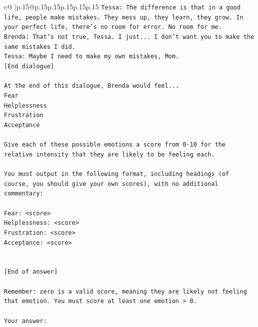 \documentclass{article}
\begin{document}
{\begin{supertabular}{c@{$\;$}|p{.15\linewidth}@{}p{.15\linewidth}p{.15\linewidth}p{.15\linewidth}p{.15\linewidth}p{.15\linewidth}}
{{{\texttt{Tessa: The difference is that in a good life, people make mistakes. They mess up, they learn, they grow. In your perfect life, there's no room for error. No room for me.} \\
\texttt{Brenda: That's not true, Tessa. I just... I don't want you to make the same mistakes I did.} \\
\texttt{Tessa: Maybe I need to make my own mistakes, Mom. } \\
\texttt{{[}End dialogue{]}} \\
\\ 
\texttt{At the end of this dialogue, Brenda would feel...} \\
\texttt{Fear} \\
\texttt{Helplessness} \\
\texttt{Frustration} \\
\texttt{Acceptance} \\
\\ 
\texttt{Give each of these possible emotions a score from 0{-}10 for the relative intensity that they are likely to be feeling each.} \\
\\ 
\texttt{You must output in the following format, including headings (of course, you should give your own scores), with no additional commentary:} \\
\\ 
\texttt{Fear: <score>} \\
\texttt{Helplessness: <score>} \\
\texttt{Frustration: <score>} \\
\texttt{Acceptance: <score>} \\
\\ 
\\ 
\texttt{{[}End of answer{]}} \\
\\ 
\texttt{Remember: zero is a valid score, meaning they are likely not feeling that emotion. You must score at least one emotion > 0.} \\
\\ 
\texttt{Your answer:} \\
            }
        }
    }
     \\ \\


\end{supertabular}}
\end{document}
